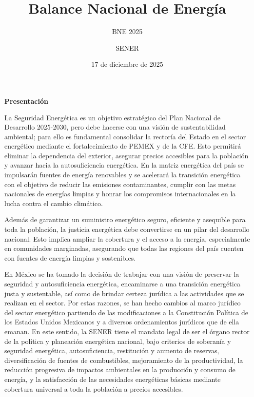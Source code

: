 \documentclass{sener2025}
\title{Balance Nacional de Energía}
\subtitle{BNE 2025}
\author{SENER}
\date{17 de diciembre de 2025}
\begin{document}

\tableofcontents
\newpage

\listatablas
\newpage

\clearpage
\begin{center}
{\Large\patriafont\bfseries\color{gobmxGuinda}Presentación}\\[1cm]
\end{center}

La Seguridad Energética es un objetivo estratégico del Plan Nacional de Desarrollo 2025-2030, pero debe hacerse con una visión de sustentabilidad ambiental; para ello es fundamental consolidar la rectoría del Estado en el sector energético mediante el fortalecimiento de PEMEX y de la CFE. Esto permitirá eliminar la dependencia del exterior, asegurar precios accesibles para la población y avanzar hacia la autosuficiencia energética. En la matriz energética del país se impulsarán fuentes de energía renovables y se acelerará la transición energética con el objetivo de reducir las emisiones contaminantes, cumplir con las metas nacionales de energías limpias y honrar los compromisos internacionales en la lucha contra el cambio climático.

Además de garantizar un suministro energético seguro, eficiente y asequible para toda la población, la justicia energética debe convertirse en un pilar del desarrollo nacional. Esto implica ampliar la cobertura y el acceso a la energía, especialmente en comunidades marginadas, asegurando que todas las regiones del país cuenten con fuentes de energía limpias y sostenibles.

En México se ha tomado la decisión de trabajar con una visión de preservar la seguridad y autosuficiencia energética, encaminarse a una transición energética justa y sustentable, así como de brindar certeza jurídica a las actividades que se realizan en el sector. Por estas razones, se han hecho cambios al marco jurídico del sector energético partiendo de las modificaciones a la Constitución Política de los Estados Unidos Mexicanos y a diversos ordenamientos jurídicos que de ella emanan. En este sentido, la SENER tiene el mandato legal de ser el órgano rector de la política y planeación energética nacional, bajo criterios de soberanía y seguridad energética, autosuficiencia, restitución y aumento de reservas, diversificación de fuentes de combustibles, mejoramiento de la productividad, la reducción progresiva de impactos ambientales en la producción y consumo de energía, y la satisfacción de las necesidades energéticas básicas mediante cobertura universal a toda la población a precios accesibles.
\end{document}
